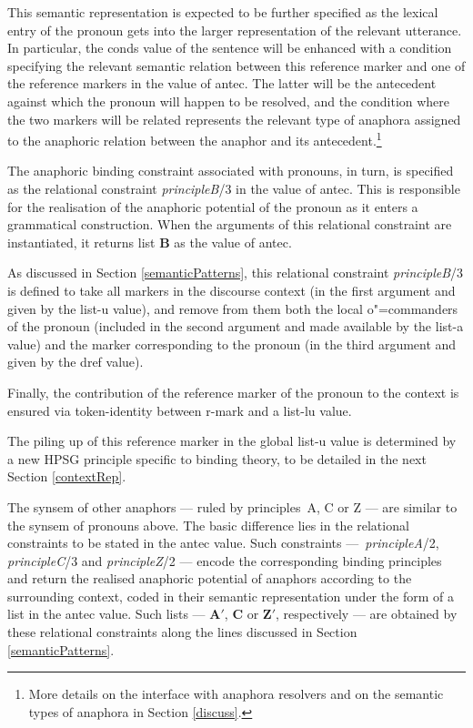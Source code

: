 \documentclass[output=paper
,modfonts
,nonflat]{langsci/langscibook}
\begin{document}
This semantic representation is expected
to be further specified as the lexical entry of the
pronoun gets into the larger representation of the
relevant utterance. In particular, the {\sc conds} value of the sentence
will be enhanced with a condition specifying the
relevant semantic relation between this reference marker
and one of the reference markers in the value
of {\sc antec}. The latter will be the antecedent against
which the pronoun will happen to be resolved, and the
condition where the two markers will be related represents the
relevant type of anaphora assigned to the anaphoric relation
between the anaphor and its antecedent.\footnote{
More details on the interface with anaphora resolvers and on the semantic types of anaphora in Section \ref{discuss}.}


The anaphoric binding constraint associated with pronouns, in turn,
is specified as the relational constraint \textit {principleB}/3
in the value of {\sc antec}.  
This is responsible for the realisation of
the anaphoric potential of the pronoun as it enters a grammatical
construction. When the arguments of this relational constraint are instantiated,
it returns list \textbf{B} as the value of {\sc antec}. 

As discussed in Section \ref{semanticPatterns}, this relational constraint \textit {principleB}/3 
is defined to take 
all markers in the discourse context (in the first argument and given 
by the {\sc list-u} value), and remove from them both the local \mbox{o"=commanders}  
of the pronoun (included in the second argument and made available by the {\sc list-a}
value)  and the marker corresponding to the pronoun (in the third  argument and
given by the {\sc dref} value).

Finally, the contribution of the reference marker of the pronoun
to the context is ensured via token-identity
between {\sc r-mark} and a {\sc list-lu} value.

The piling up of this reference
marker in the global {\sc list-u} value is determined
by a new HPSG principle specific to binding theory, to be detailed in the next Section \ref{contextRep}.

The {\sc synsem} of other anaphors --- ruled by principles~A, C or Z --- are 
similar to the {\sc synsem} of pronouns above. The basic difference lies in the
relational constraints to be stated in the {\sc antec} value. Such constraints  
---~{\it principleA}/2, {\it principleC}/3 and {\it principleZ}/2 --- encode the 
corresponding binding principles and return the realised
anaphoric potential of anaphors according to the surrounding context,
coded in their semantic representation under the form
of a list in the {\sc antec} value. Such 
lists --- \textbf{A$'$}, \textbf{C} or \textbf{Z$'$}, respectively --- are obtained 
by these relational constraints along the lines
discussed in Section \ref{semanticPatterns}.
\end{document}

